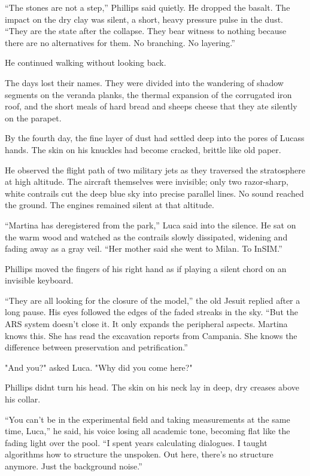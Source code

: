 \documentclass[
  ngerman,
]{article}
\begin{document}
``The stones are not a step,'' Phillips said quietly. He dropped the
basalt. The impact on the dry clay was silent, a short, heavy pressure
pulse in the dust. ``They are the state after the collapse. They bear
witness to nothing because there are no alternatives for them. No
branching. No layering.''

He continued walking without looking back.

The days lost their names. They were divided into the wandering of
shadow segments on the veranda planks, the thermal expansion of the
corrugated iron roof, and the short meals of hard bread and
sheep\textquotesingle s cheese that they ate silently on the parapet.

By the fourth day, the fine layer of dust had settled deep into the
pores of Lucas\textquotesingle s hands. The skin on his knuckles had
become cracked, brittle like old paper.

He observed the flight path of two military jets as they traversed the
stratosphere at high altitude. The aircraft themselves were invisible;
only two razor-sharp, white contrails cut the deep blue sky into precise
parallel lines. No sound reached the ground. The engines remained silent
at that altitude.

``Martina has deregistered from the park,'' Luca said into the silence.
He sat on the warm wood and watched as the contrails slowly dissipated,
widening and fading away as a gray veil. ``Her mother said she went to
Milan. To InSIM.''

Phillips moved the fingers of his right hand as if playing a silent
chord on an invisible keyboard.

``They are all looking for the closure of the model,'' the old Jesuit
replied after a long pause. His eyes followed the edges of the faded
streaks in the sky. ``But the ARS system doesn't close it. It only
expands the peripheral aspects. Martina knows this. She has read the
excavation reports from Campania. She knows the difference between
preservation and petrification.''

"And you?" asked Luca. "Why did you come here?"

Phillips didn\textquotesingle t turn his head. The skin on his neck lay
in deep, dry creases above his collar.

``You can't be in the experimental field and taking measurements at the
same time, Luca,'' he said, his voice losing all academic tone, becoming
flat like the fading light over the pool. ``I spent years calculating
dialogues. I taught algorithms how to structure the unspoken. Out here,
there's no structure anymore. Just the background noise.''
\end{document}
